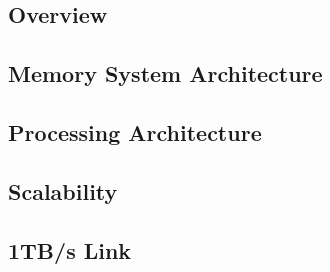 \subsection{Overview}
\label{sec:overview}


\subsection{Memory System Architecture}
\label{sec:memory}


\subsection{Processing Architecture}
\label{sec:processing}


\subsection{Scalability}
\label{sec:scale}



\subsection{1TB/s Link}
\label{sec:link}

